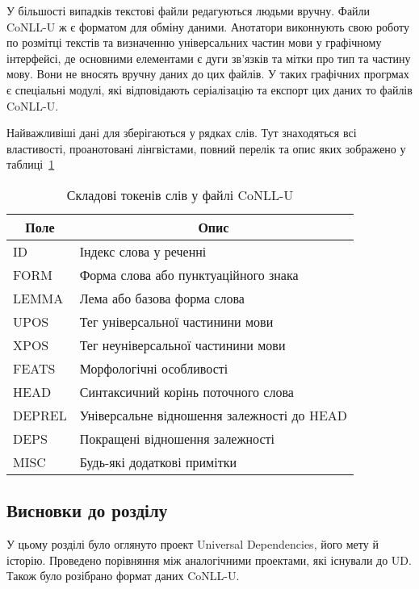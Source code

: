 У більшості випадків текстові файли редагуються людьми вручну. Файли
CoNLL-U ж є форматом для обміну даними. Анотатори виконнують свою
роботу по розмітці текстів та визначенню універсальних частин мови
у графічному інтерфейсі, де основними елементами є дуги зв'язків
та мітки про тип та частину мову. Вони не вносять вручну даних до
цих файлів. У таких графічних прогрмах є спеціальні модулі,
які відповідають серіалізацію та експорт цих даних то файлів CoNLL-U.

Найважливіші дані для зберігаються у рядках слів. Тут знаходяться всі властивості,
проанотовані лінгвістами, повний перелік та опис яких зображено у
таблиці~\ref{table:conllu}

\begin{table}[ht]
\caption{Складові токенів слів у файлі CoNLL-U}
\label{table:conllu}
\centering
\begin{tabular}{|l|l|}
\hline
\multicolumn{1}{|c|}{Поле} & \multicolumn{1}{|c|}{Опис} \\ \hline
  
ID        & Індекс слова у реченні \\ \hline
FORM      & Форма слова або пунктуаційного знака \\ \hline
LEMMA     & Лема або базова форма слова \\ \hline
UPOS      & Тег універсальної частинини мови \\ \hline
XPOS      & Тег неуніверсальної частинини мови \\ \hline
FEATS     & Морфологічні особливості \\ \hline
HEAD      & Синтаксичний корінь поточного слова \\ \hline
DEPREL    & Універсальне відношення залежності до HEAD \\ \hline
DEPS      & Покращені відношення залежності \\ \hline
MISC      & Будь-які додаткові примітки \\ \hline
\end{tabular}
\end{table}

\subsection*{Висновки до розділу }
У цьому розділі було оглянуто проект Universal Dependencies, його мету й
історію. Проведено порівняння між аналогічними проектами, які існували до UD.
Також було розібрано формат даних CoNLL\nobreakdash-U.